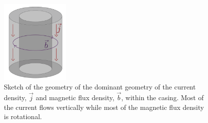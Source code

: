 \begin{figure}
    \begin{center}
    \includegraphics[width=0.3\textwidth]{figures/em_casing/casing_flux_geometry.png}
    \end{center}
\caption{
    Sketch of the geometry of the dominant geometry of the current density,
    $\vec{j}$ and magnetic flux density, $\vec{b}$, within the casing.
    Most of the current flows vertically
    while most of the magnetic flux density is rotational.
}
\label{fig:casing_flux_geometry}
\end{figure}



